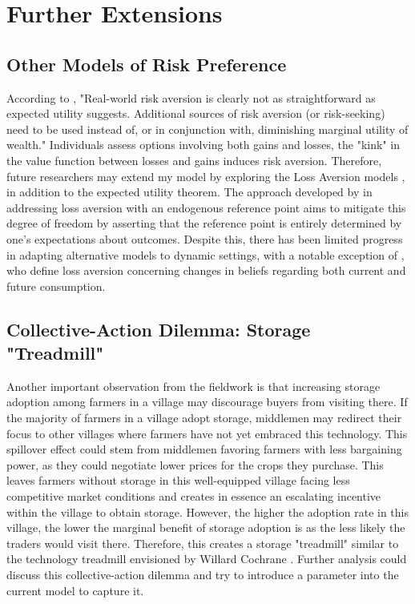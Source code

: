 

\section{Further Extensions}

\subsection{Other Models of Risk Preference}
\noindent According to \cite{o2018modeling}, "Real-world risk aversion is clearly not as straightforward as expected utility suggests. Additional sources of risk aversion (or risk-seeking) need to be used instead of, or in conjunction with, diminishing marginal utility of wealth." Individuals assess options involving both gains and losses, the "kink" in the value function between losses and gains induces risk aversion. Therefore, future researchers may extend my model by exploring the Loss Aversion models \citep{kahneman1979prospect}, in addition to the expected utility theorem. The approach developed by \cite{kHoszegi2006model, kHoszegi2007reference, kHoszegi2009reference} in addressing loss aversion with an endogenous reference point aims to mitigate this degree of freedom by asserting that the reference point is entirely determined by one's expectations about outcomes. Despite this, there has been limited progress in adapting alternative models to dynamic settings, with a notable exception of \cite{kHoszegi2009reference}, who define loss aversion concerning changes in beliefs regarding both current and future consumption.



\subsection{Collective-Action Dilemma: Storage "Treadmill"}
\noindent Another important observation from the fieldwork is that increasing storage adoption among farmers in a village may discourage buyers from visiting there. If the majority of farmers in a village adopt storage, middlemen may redirect their focus to other villages where farmers have not yet embraced this technology. This spillover effect could stem from middlemen favoring farmers with less bargaining power, as they could negotiate lower prices for the crops they purchase. This leaves farmers without storage in this well-equipped village facing less competitive market conditions and creates in essence an escalating incentive within the village to obtain storage. However, the higher the adoption rate in this village, the lower the marginal benefit of storage adoption is as the less likely the traders would visit there. Therefore, this creates a storage "treadmill" similar to the technology treadmill envisioned by Willard Cochrane \citep{levins1996treadmill, cochrane1958farm}. Further analysis could discuss this collective-action dilemma and try to introduce a parameter into the current model to capture it.



